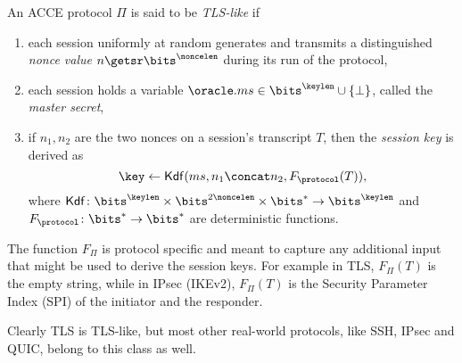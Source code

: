 
\begin{definition}\label{def:TLS-like}
An ACCE protocol $\Pi$ is said to be \emph{TLS-like} if
\begin{enumerate}[label=(\roman*),ref=\ref*{def:TLS-like}.\roman*]
	\item\label{def:TLS-like:nonces_generated_and_sent} each session uniformly at random generates and transmits a distinguished \emph{nonce value} $n \getsr \bits^\noncelen$ during its run of the protocol,
	
	\item\label{def:TLS-like:ms_variable_present} each session holds a variable $\oracle.ms \in \bits^\keylen \cup \lbrace \bot \rbrace$, called the \emph{master secret},
	
	\item\label{def:TLS-like:kdf_use_ms_and_nonces} if $n_1, n_2$ are the two nonces on a session's transcript $T$,
	then the \emph{session key} is derived as 
	\begin{equation}\label{eq:TLS-like:key-derivation}
		\key \gets \mathsf{Kdf}(ms, n_1 \concat n_2, F_{\protocol}(T)), 
	\end{equation}
	where $\mathsf{Kdf} \colon \bits^\keylen \times \bits^{2\noncelen} \times \bits^* \to \bits^\keylen$ and $F_{\protocol} \colon \bits^* \to \bits^*$  are deterministic functions.
\end{enumerate}

\end{definition}


\begin{remark}
The function $F_{\Pi}$ is protocol specific and meant to capture any additional input that might be used to derive the session keys.
For example in TLS, $F_{\Pi}(T)$ is the empty string, 
while in IPsec (IKEv2), $F_{\Pi}(T)$ is the Security Parameter Index (SPI) of the initiator and the responder.
\end{remark}

\begin{remark}
Clearly TLS is TLS-like,
but most other real-world protocols,
like SSH, IPsec and QUIC,
belong to this class as well.
\end{remark}

